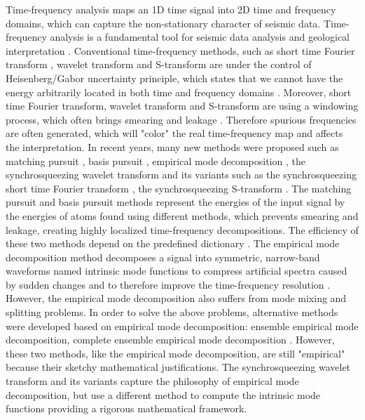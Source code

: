 Time-frequency analysis maps an 1D time signal into 2D time and frequency domains, 
which can capture the non-stationary character of seismic data. Time-frequency 
analysis is a fundamental tool for seismic data analysis and geological 
interpretation \cite[]{Castagna2003,Reine2009,yangkang2014sswt,liuwei2016}. 
Conventional time-frequency methods, such as short time Fourier transform \cite[]{Cohen1989}, 
wavelet transform \cite[]{Mallat1989} and S-transform \cite[]{Stockwell1996} 
are under the control of Heisenberg/Gabor uncertainty principle, which states 
that we cannot have the energy arbitrarily located in both time and frequency 
domains \cite[]{mallat}. Moreover, short time Fourier transform, wavelet transform 
and S-transform are using a windowing process, which often brings smearing and 
leakage \cite[]{Tary2014}. Therefore spurious frequencies are often generated, 
which will "color" the real time-frequency map and affects the interpretation. 
In recent years, many new methods were proposed such as matching pursuit \cite[]{Mallat1993}, 
basis pursuit \cite[]{basispursuit}, empirical mode decomposition \cite[]{emd,emdseis}, 
the synchrosqueezing wavelet transform \cite[]{daubechies} and its variants such as the 
synchrosqueezing short time Fourier transform \cite[]{Oberlin2014}, 
the synchrosqueezing S-transform \cite[]{Synchrostran}. The matching pursuit and basis pursuit methods 
represent the energies of the input signal by the energies of atoms found using 
different methods, which prevents smearing and leakage, creating highly 
localized time-frequency decompositions. The efficiency of these two methods depend
on the predefined dictionary \cite[]{Tary2014}. The empirical mode decomposition 
method decomposes a signal into symmetric, narrow-band waveforms named intrinsic 
mode functions to compress artificial spectra caused by sudden changes and to 
therefore improve the time-frequency resolution \cite[]{han}. However, the empirical mode
decomposition also suffers from mode mixing and splitting problems. 
In order to solve the above problems, alternative methods were developed 
based on empirical mode decomposition: ensemble empirical mode decomposition\cite[]{eemd}, 
complete ensemble empirical mode decomposition \cite[]{ceemd}. However, these two methods, 
like the empirical mode decomposition, are still "empirical" because 
their sketchy mathematical justifications. The synchrosqueezing wavelet 
transform \cite[]{daubechies} and its variants capture the philosophy of 
empirical mode decomposition, but use a different method to compute the 
intrinsic mode functions providing a rigorous mathematical framework.


